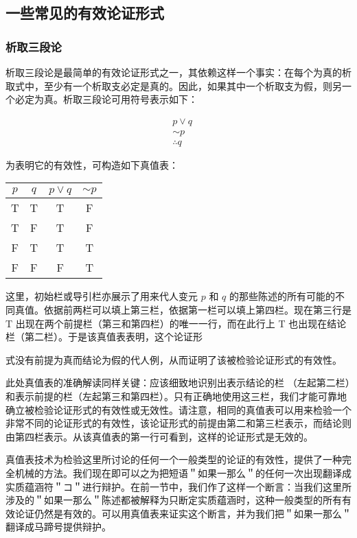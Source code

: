 \subsection{一些常见的有效论证形式}
\subsubsection{析取三段论}
析取三段论是最简单的有效论证形式之一，其依赖这样一个事实：在每个为真的析取式中，至少有一个析取支必定是真的。因此，如果其中一个析取支为假，则另一个必定为真。析取三段论可用符号表示如下：

$$
\begin{aligned}
& p \vee q \\
& \sim p \\
& \therefore q
\end{aligned}
$$

为表明它的有效性，可构造如下真值表：

\begin{center}
\begin{tabular}{|cccc|}
\hline
$p$ & $q$ & $p \vee q$ & $\sim p$ \\
\hline
T & T & T & F \\
T & F & T & F \\
F & T & T & T \\
F & F & F & T \\
\hline
\end{tabular}
\end{center}

这里，初始栏或导引栏亦展示了用来代人变元 $p$ 和 $q$ 的那些陈述的所有可能的不同真值。依据前两栏可以填上第三栏，依据第一栏可以填上第四栏。现在第三行是 T 出现在两个前提栏（第三和第四栏）的唯一一行，而在此行上 T 也出现在结论栏（第二栏）。于是该真值表表明，这个论证形

式没有前提为真而结论为假的代人例，从而证明了该被检验论证形式的有效性。\cite{jevons1879}

此处真值表的准确解读同样关键：应该细致地识别出表示结论的栏 （左起第二栏）和表示前提的栏（左起第三和第四栏）。只有正确地使用这三栏，我们才能可靠地确立被检验论证形式的有效性或无效性。请注意，相同的真值表可以用来检验一个非常不同的论证形式的有效性，该论证形式的前提由第二和第三栏表示，而结论则由第四栏表示。从该真值表的第一行可看到，这样的论证形式是无效的。

真值表技术为检验这里所讨论的任何一个一般类型的论证的有效性，提供了一种完全机械的方法。我们现在即可以之为把短语＂如果一那么＂的任何一次出现翻译成实质蕴涵符＂コ＂进行辩护。在前一节中，我们作了这样一个断言：当我们这里所涉及的＂如果一那么＂陈述都被解释为只断定实质蕴涵时，这种一般类型的所有有效论证仍然是有效的。可以用真值表来证实这个断言，并为我们把＂如果一那么＂翻译成马蹄号提供辩护。


